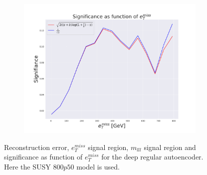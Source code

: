 \begin{figure}[H]
    \begin{subfigure}{.40\textwidth}
        \includegraphics[width=\textwidth]{Figures/AE_testing/big/2lep/significance_etmiss_800p0p050_-0.7416855615358031.pdf}
        \caption{}
        \label{fig:AE_2lep_big_signi_800_3}
    \end{subfigure}
    \hfill      
    \caption[2lep deep network | $800p50$ | AE | 3]{Reconstruction error, $e_T^{miss}$ signal region, $m_{lll}$ signal region and significance as function of 
    $e_T^{miss}$ for the deep regular autoencoder. Here the SUSY $800p50$ model is used.}
    \label{fig:AE_2lep_big_rec_sig_signi_800_3}
\end{figure}

